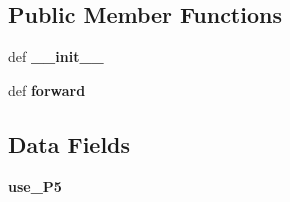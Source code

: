 \subsection*{Public Member Functions}
\begin{DoxyCompactItemize}
\item 
\mbox{\label{classtorchvision_1_1ops_1_1feature__pyramid__network_1_1LastLevelP6P7_aa0d987636ddcc044e7aba61426c91d51}} 
def {\bfseries \+\_\+\+\_\+init\+\_\+\+\_\+}
\item 
\mbox{\label{classtorchvision_1_1ops_1_1feature__pyramid__network_1_1LastLevelP6P7_a0750c0d29da31803135bf4109b84c809}} 
def {\bfseries forward}
\end{DoxyCompactItemize}
\subsection*{Data Fields}
\begin{DoxyCompactItemize}
\item 
\mbox{\label{classtorchvision_1_1ops_1_1feature__pyramid__network_1_1LastLevelP6P7_a47f21a70f1d6d64637859c51be4bf627}} 
{\bfseries use\+\_\+\+P5}
\end{DoxyCompactItemize}
